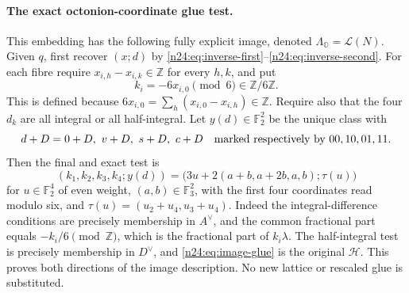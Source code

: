 \paragraph{The exact octonion-coordinate glue test.}
This embedding has the following fully explicit image, denoted
\(\Lambda_{\mathbb O}=\mathcal L(N)\).  Given \(q\), first recover
\((x;d)\) by \eqref{n24:eq:inverse-first}--\eqref{n24:eq:inverse-second}.
For each fibre require
\(x_{i,h}-x_{i,k}\in\mathbb Z\) for every \(h,k\), and put
\[
 k_i=-6x_{i,0}\pmod6\in\mathbb Z/6\mathbb Z.
\]
This is defined because
\(6x_{i,0}=\sum_h(x_{i,0}-x_{i,h})\in\mathbb Z\).
Require also that the four \(d_k\) are all integral or all
half-integral.  Let \(y(d)\in\mathbb F_2^2\) be the unique class with
\[
 d+D=0+D,\ v+D,\ s+D,\ c+D
 \quad\hbox{marked respectively by }00,10,01,11.
\]
Then the final and exact test is
\begin{equation}
 (k_1,k_2,k_3,k_4;y(d))
   =\bigl(3u+2(a+b,a+2b,a,b);\tau(u)\bigr)
 \label{n24:eq:image-glue}
\end{equation}
for \(u\in\mathbb F_2^4\) of even weight,
\((a,b)\in\mathbb F_3^2\), with the first four coordinates read
modulo six, and \(\tau(u)=(u_2+u_4,u_3+u_4)\).
Indeed the integral-difference conditions are precisely membership in
\(A^\vee\), and the common fractional part equals
\(-k_i/6\pmod{\mathbb Z}\), which is the fractional part of
\(k_i\lambda\).  The half-integral test is precisely membership in
\(D^\vee\), and \eqref{n24:eq:image-glue} is the original
\(\mathcal H\).  This proves both directions of the image
description.  No new lattice or rescaled glue is substituted.

